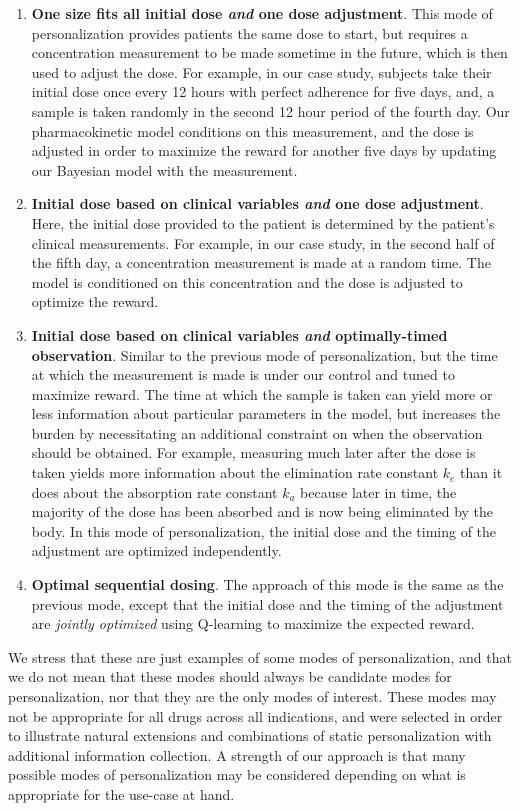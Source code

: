 \begin{enumerate}
	\item \textbf{One size fits all initial dose \textit{and} one dose adjustment}.  This mode of personalization provides patients the same dose to start, but requires a concentration measurement to be made sometime in the future, which is then used to adjust the dose.  For example, in our case study, subjects take their initial dose once every 12 hours with perfect adherence for five days, and, a sample is taken randomly in the second 12 hour period of the fourth day.  Our pharmacokinetic model conditions on this measurement, and the dose is adjusted in order to maximize the reward for another five days by updating our Bayesian model with the measurement.
	
	\item \textbf{Initial dose based on clinical variables \textit{and} one dose adjustment}.  Here, the initial dose provided to the patient is determined by the patient's clinical measurements. For example, in our case study, in the second half of the fifth day, a concentration measurement is made at a random time. The model is conditioned on this concentration and the dose is adjusted to optimize the reward.
	
	\item \textbf{Initial dose based on clinical variables \textit{and} optimally-timed observation}.  Similar to the previous mode of personalization, but the time at which the measurement is made is under our control and tuned to maximize reward. The time at which the sample is taken can yield more or less information about particular parameters in the model, but increases the burden by necessitating an additional constraint on when the observation should be obtained. For example, measuring much later after the dose is taken yields more information about the elimination rate constant $k_e$ than it does about the absorption rate constant $k_a$ because later in time, the majority of the dose has been absorbed and is now being eliminated by the body. In this mode of personalization, the initial dose and the timing of the adjustment are optimized independently. 
	
	\item \textbf{Optimal sequential dosing}. The approach of this mode is the same as the previous mode, except that the initial dose and the timing of the adjustment are \textit{jointly optimized} using Q-learning to maximize the expected reward.
\end{enumerate}
We stress that these are just examples of some modes of personalization, and that we do not mean that these modes should always be candidate modes for personalization, nor that they are the only modes of interest.  These modes may not be appropriate for all drugs across all indications, and were selected in order to illustrate natural extensions and combinations of static personalization with additional information collection. A strength of our approach is that many possible modes of personalization may be considered depending on what is appropriate for the use-case at hand.

